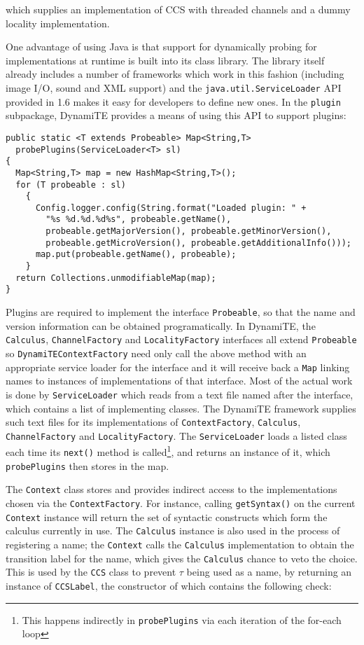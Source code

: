 \noindent which supplies an implementation of CCS with threaded
channels and a dummy locality implementation.

One advantage of using Java is that support for dynamically probing
for implementations at runtime is built into its class library.  The
library itself already includes a number of frameworks which work in
this fashion (including image I/O, sound and XML support) and the
\texttt{java.util.ServiceLoader} API provided in 1.6 makes it easy for
developers to define new ones.  In the \texttt{plugin} subpackage,
DynamiTE provides a means of using this API to support plugins:

\begin{verbatim}
public static <T extends Probeable> Map<String,T>
  probePlugins(ServiceLoader<T> sl)
{
  Map<String,T> map = new HashMap<String,T>();
  for (T probeable : sl)
    {
      Config.logger.config(String.format("Loaded plugin: " +
        "%s %d.%d.%d%s", probeable.getName(),
        probeable.getMajorVersion(), probeable.getMinorVersion(),
        probeable.getMicroVersion(), probeable.getAdditionalInfo()));
      map.put(probeable.getName(), probeable);
    }
  return Collections.unmodifiableMap(map);
}
\end{verbatim}

\noindent Plugins are required to implement the interface
\texttt{Probeable}, so that the name and version information can be
obtained programatically.  In DynamiTE, the \texttt{Calculus},
\texttt{ChannelFactory} and \texttt{LocalityFactory} interfaces all
extend \texttt{Probeable} so \texttt{DynamiTEContextFactory} need only
call the above method with an appropriate service loader for the
interface and it will receive back a \texttt{Map} linking names to
instances of implementations of that interface.  Most of the actual
work is done by \texttt{ServiceLoader} which reads from a text file
named after the interface, which contains a list of implementing
classes.  The DynamiTE framework supplies such text files for its
implementations of \texttt{ContextFactory}, \texttt{Calculus},
\texttt{ChannelFactory} and \texttt{LocalityFactory}.  The
\texttt{ServiceLoader} loads a listed class each time its
\texttt{next()} method is called\footnote{This happens indirectly in
  \texttt{probePlugins} via each iteration of the for-each loop}, and
returns an instance of it, which \texttt{probePlugins} then stores in
the map.

The \texttt{Context} class stores and provides indirect access to the
implementations chosen via the \texttt{ContextFactory}.  For instance,
calling \texttt{getSyntax()} on the current \texttt{Context} instance
will return the set of syntactic constructs which form the calculus
currently in use.  The \texttt{Calculus} instance is also used in the
process of registering a name; the \texttt{Context} calls the
\texttt{Calculus} implementation to obtain the transition label for
the name, which gives the \texttt{Calculus} chance to veto the choice.
This is used by the \texttt{CCS} class to prevent $\tau$ being used as
a name, by returning an instance of \texttt{CCSLabel}, the constructor
of which contains the following check:

